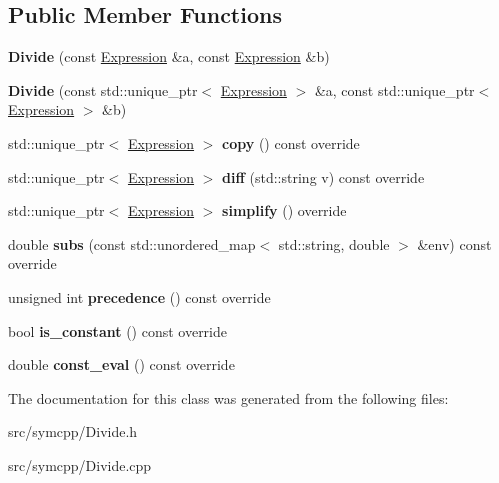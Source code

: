 \subsection*{Public Member Functions}
\begin{DoxyCompactItemize}
\item 
{\bfseries Divide} (const \hyperlink{classExpression}{Expression} \&a, const \hyperlink{classExpression}{Expression} \&b)\hypertarget{classDivide_a26b9306afa52e58cda0ece440083301b}{}\label{classDivide_a26b9306afa52e58cda0ece440083301b}

\item 
{\bfseries Divide} (const std\+::unique\+\_\+ptr$<$ \hyperlink{classExpression}{Expression} $>$ \&a, const std\+::unique\+\_\+ptr$<$ \hyperlink{classExpression}{Expression} $>$ \&b)\hypertarget{classDivide_a95da92edcf5718c17a1d44619ecbed6d}{}\label{classDivide_a95da92edcf5718c17a1d44619ecbed6d}

\item 
std\+::unique\+\_\+ptr$<$ \hyperlink{classExpression}{Expression} $>$ {\bfseries copy} () const override\hypertarget{classDivide_a085ef561b7f23a6de8142ccf6860881c}{}\label{classDivide_a085ef561b7f23a6de8142ccf6860881c}

\item 
std\+::unique\+\_\+ptr$<$ \hyperlink{classExpression}{Expression} $>$ {\bfseries diff} (std\+::string v) const override\hypertarget{classDivide_a516e2c728645548ea0e62ce7a66411c1}{}\label{classDivide_a516e2c728645548ea0e62ce7a66411c1}

\item 
std\+::unique\+\_\+ptr$<$ \hyperlink{classExpression}{Expression} $>$ {\bfseries simplify} () override\hypertarget{classDivide_a56bf4d579b7af795795b23b90b1c1a6c}{}\label{classDivide_a56bf4d579b7af795795b23b90b1c1a6c}

\item 
double {\bfseries subs} (const std\+::unordered\+\_\+map$<$ std\+::string, double $>$ \&env) const override\hypertarget{classDivide_af57f625578b8b7aea4d8f9a5a04f4535}{}\label{classDivide_af57f625578b8b7aea4d8f9a5a04f4535}

\item 
unsigned int {\bfseries precedence} () const override\hypertarget{classDivide_a9069bc04a3d7970f5b04d27072d27cd0}{}\label{classDivide_a9069bc04a3d7970f5b04d27072d27cd0}

\item 
bool {\bfseries is\+\_\+constant} () const override\hypertarget{classDivide_a72a9774a7101e8a4d9834caf87da6284}{}\label{classDivide_a72a9774a7101e8a4d9834caf87da6284}

\item 
double {\bfseries const\+\_\+eval} () const override\hypertarget{classDivide_a9d6130d8041926a952d49a99ac39a0c0}{}\label{classDivide_a9d6130d8041926a952d49a99ac39a0c0}

\end{DoxyCompactItemize}


The documentation for this class was generated from the following files\+:\begin{DoxyCompactItemize}
\item 
src/symcpp/Divide.\+h\item 
src/symcpp/Divide.\+cpp\end{DoxyCompactItemize}
